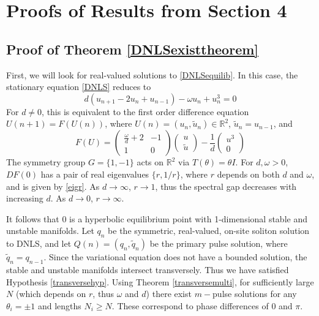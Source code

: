 \documentclass[12pt]{elsarticle}
\def\R{{\mathbb R}}
\begin{document}
\section{Proofs of Results from Section 4}

\subsection{Proof of Theorem \ref{DNLSexisttheorem}}

First, we will look for real-valued solutions to \eqref{DNLSequilib}. In this case, the stationary equation \eqref{DNLS} reduces to
\begin{equation*}
d(u_{n+1} - 2 u_n + u_{n-1}) - \omega u_n + u_n^3 = 0
\end{equation*}
For $d \neq 0$, this is equivalent to the first order difference equation $U(n+1) = F(U(n))$, where $U(n) = (u_n, \tilde{u}_n) \in \R^2$, $\tilde{u}_n = u_{n-1}$, and 
\begin{equation}\label{dnlsdiffR2}
F(U) = 
\begin{pmatrix}
\frac{\omega}{d} + 2 & -1 \\
1 & 0
\end{pmatrix}
\begin{pmatrix}
u \\ \tilde{u}
\end{pmatrix}
- \frac{1}{d} 
\begin{pmatrix}
u^3 \\ 0
\end{pmatrix}
\end{equation}
The symmetry group $G = \{ 1, -1\}$ acts on $\R^2$ via $T(\theta) = \theta I$. For $d, \omega > 0$, $DF(0)$ has a pair of real eigenvalues $\{r, 1/r \}$, where $r$ depends on both $d$ and $\omega$, and is given by \eqref{eigr}. As $d \rightarrow \infty$, $r \rightarrow 1$, thus the spectral gap decreases with increasing $d$. As $d \rightarrow 0$, $r \rightarrow \infty$.

It follows that 0 is a hyperbolic equilibrium point with 1-dimensional stable and unstable manifolds. Let $q_n$ be the symmetric, real-valued, on-site soliton solution to DNLS, and let $Q(n) = (q_n, \tilde{q}_n)$ be the primary pulse solution, where $\tilde{q}_n = q_{n-1}$. Since the variational equation does not have a bounded solution, the stable and unstable manifolds intersect transversely. Thus we have satisfied Hypothesis \ref{transversehyp}. Using Theorem \ref{transversemulti}, for sufficiently large $N$ (which depends on $r$, thus $\omega$ and $d$) there exist $m-$pulse solutions for any $\theta_i = \pm 1$ and lengths $N_i \geq N$. These correspond to phase differences of $0$ and $\pi$.
\end{document}
